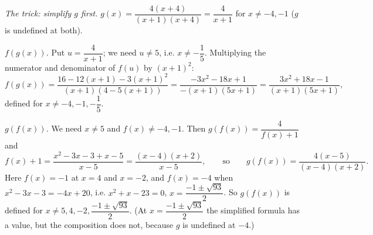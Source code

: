 \emph{The trick: simplify $g$ first.} $g(x)=\dfrac{4(x+4)}{(x+1)(x+4)}=\dfrac4{x+1}$ for $x\ne-4,-1$ ($g$ is undefined at both).

\emph{$f(g(x))$.} Put $u=\dfrac4{x+1}$; we need $u\ne5$, i.e. $x\ne-\dfrac15$. Multiplying the numerator and denominator of $f(u)$ by $(x+1)^2$:
\[f(g(x))=\dfrac{16-12(x+1)-3(x+1)^2}{(x+1)\left(4-5(x+1)\right)}=\dfrac{-3x^2-18x+1}{-(x+1)(5x+1)}=\boxed{\dfrac{3x^2+18x-1}{(x+1)(5x+1)}},\]
defined for $x\ne-4,-1,-\dfrac15$.

\emph{$g(f(x))$.} We need $x\ne5$ and $f(x)\ne-4,-1$. Then $g(f(x))=\dfrac4{f(x)+1}$ and
\[f(x)+1=\dfrac{x^2-3x-3+x-5}{x-5}=\dfrac{(x-4)(x+2)}{x-5},\qquad\text{so}\qquad g(f(x))=\boxed{\dfrac{4(x-5)}{(x-4)(x+2)}}.\]
Here $f(x)=-1$ at $x=4$ and $x=-2$, and $f(x)=-4$ when $x^2-3x-3=-4x+20$, i.e. $x^2+x-23=0$, $x=\dfrac{-1\pm\sqrt{93}}2$. So $g(f(x))$ is defined for $x\ne5,4,-2,\dfrac{-1\pm\sqrt{93}}2$. (At $x=\dfrac{-1\pm\sqrt{93}}2$ the simplified formula has a value, but the composition does not, because $g$ is undefined at $-4$.)
